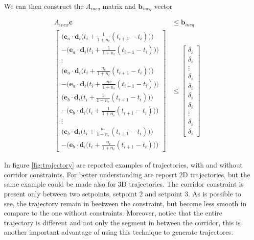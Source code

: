 \noindent We can then construct the $A_{ineq}$ matrix and $\mathbf{b}_{ineq}$ vector

\begin{align}
	A_{inex}\mathbf{c} &\le \mathbf{b}_{ineq} \\
	\begin{bmatrix}
		\Big(\mathbf{e}_a\cdot\mathbf{d}_i\big(t_i+\frac{1}{1+n_c}(t_{i+1}-t_i)\big)\Big) \\
		-\Big(\mathbf{e}_a\cdot\mathbf{d}_i\big(t_i+\frac{1}{1+n_c}(t_{i+1}-t_i)\big)\Big) \\
		\vdots \\
		\Big(\mathbf{e}_a\cdot\mathbf{d}_i\big(t_i+\frac{n_c}{1+n_c}(t_{i+1}-t_i)\big)\Big) \\
		-\Big(\mathbf{e}_a\cdot\mathbf{d}_i\big(t_i+\frac{nc}{1+n_c}(t_{i+1}-t_i)\big)\Big) \\
		\Big(\mathbf{e}_b\cdot\mathbf{d}_i\big(t_i+\frac{1}{1+n_c}(t_{i+1}-t_i)\big)\Big) \\
		-\Big(\mathbf{e}_b\cdot\mathbf{d}_i\big(t_i+\frac{1}{1+n_c}(t_{i+1}-t_i)\big)\Big) \\
		\vdots \\
		\Big(\mathbf{e}_b\cdot\mathbf{d}_i\big(t_i+\frac{n_c}{1+n_c}(t_{i+1}-t_i)\big)\Big) \\
		-\Big(\mathbf{e}_b\cdot\mathbf{d}_i\big(t_i+\frac{n_c}{1+n_c}(t_{i+1}-t_i)\big)\Big)
	\end{bmatrix}
	&\le
	\begin{bmatrix}
		\delta_i \\
		\delta_i \\
		\vdots   \\
		\delta_i \\
		\delta_i \\
		\delta_i \\
		\delta_i \\
		\vdots   \\
		\delta_i \\
		\delta_i
	\end{bmatrix} \nonumber 
\end{align}

\noindent In figure \ref{fig:trajectory} are reported examples of trajectories, with and without corridor constraints. For better understanding are reposrt 2D trajectories, but the same example could be made also for 3D trajectories. The corridor constraint is present only between two setpoints, setpoint 2 and setpoint 3. As is possible to see, the trajectory remain in beetween the constraint, but become less smooth in compare to the one without constraints. Moreover, notice that the entire trajectory is different and not only the segment in between the corridor, this is another important advantage of using this technique to generate trajectores. 
